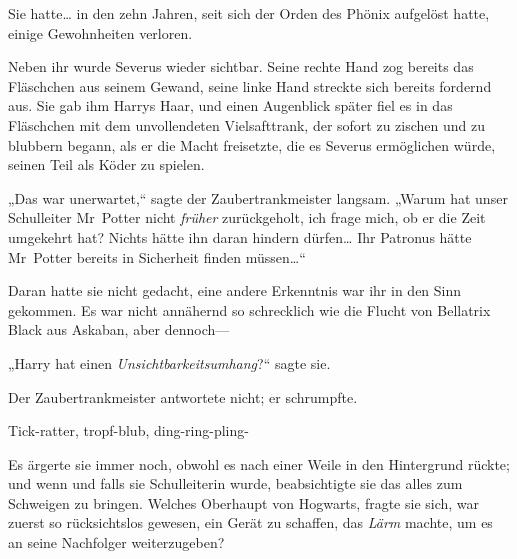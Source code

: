 Sie hatte… in den zehn Jahren, seit sich der Orden des Phönix aufgelöst hatte, einige Gewohnheiten verloren.

Neben ihr wurde Severus wieder sichtbar. Seine rechte Hand zog bereits das Fläschchen aus seinem Gewand, seine linke Hand streckte sich bereits fordernd aus. Sie gab ihm Harrys Haar, und einen Augenblick später fiel es in das Fläschchen mit dem unvollendeten Vielsafttrank, der sofort zu zischen und zu blubbern begann, als er die Macht freisetzte, die es Severus ermöglichen würde, seinen Teil als Köder zu spielen.

„Das war unerwartet,“ sagte der Zaubertrankmeister langsam. „Warum hat unser Schulleiter Mr~Potter nicht \emph{früher} zurückgeholt, ich frage mich, ob er die Zeit umgekehrt hat? Nichts hätte ihn daran hindern dürfen… Ihr Patronus hätte Mr~Potter bereits in Sicherheit finden müssen…“

Daran hatte sie nicht gedacht, eine andere Erkenntnis war ihr in den Sinn gekommen. Es war nicht annähernd so schrecklich wie die Flucht von Bellatrix Black aus Askaban, aber dennoch—

„Harry hat einen \emph{Unsichtbarkeitsumhang}?“ sagte sie.

Der Zaubertrankmeister antwortete nicht; er schrumpfte.

\later

Tick-ratter, tropf-blub, ding-ring-pling-

Es ärgerte sie immer noch, obwohl es nach einer Weile in den Hintergrund rückte; und wenn und falls sie Schulleiterin wurde, beabsichtigte sie das alles zum Schweigen zu bringen. Welches Oberhaupt von Hogwarts, fragte sie sich, war zuerst so rücksichtslos gewesen, ein Gerät zu schaffen, das \emph{Lärm} machte, um es an seine Nachfolger weiterzugeben?

